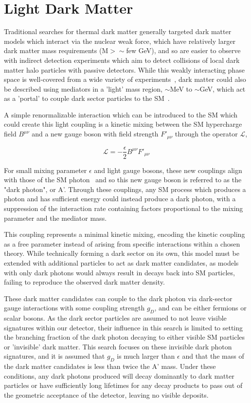 \section{Light Dark Matter}
Traditional searches for thermal dark matter generally targeted dark matter models which interact via the nuclear weak force, which have relatively larger dark matter mass requirements (M$>\sim$few GeV), and so are easier to observe with indirect detection experiments which aim to detect collisions of local dark matter halo particles with passive detectors.
While this weakly interacting phase space is well-covered from a wide variety of experiments~\cite{Roszkowski_2018}, dark matter could also be described using mediators in a 'light' mass region, $\sim$MeV to $\sim$GeV, which act as a 'portal' to couple dark sector particles to the SM~\cite{darkSectors}.

A simple renormalizable interaction which can be introduced to the SM which could create this light coupling is a kinetic mixing between the SM hypercharge field $B^{\mu\nu}$ and a new gauge boson with field strength $F'_{\mu\nu}$ through the operator $\mathcal{L}$,  

\begin{equation}
	\label{eq:LDMlagrangian}
	\mathcal{L} = - \frac{\epsilon}{2} B^{\mu\nu}F'_{\mu\nu}
\end{equation}

For small mixing parameter $\epsilon$ and light gauge bosons, these new couplings align with those of the SM photon~\cite{Bauer_2018} and so this new gauge boson is referred to as the "dark photon", or A'.
Through these couplings, any SM process which produces a photon and has sufficient energy could instead produce a dark photon, with a suppression of the interaction rate containing factors proportional to the mixing parameter and the mediator mass.

This coupling represents a minimal kinetic mixing, encoding the kinetic coupling as a free parameter instead of arising from specific interactions within a chosen theory. 
While technically forming a dark sector on its own, this model must be extended with additional particles to act as dark matter candidates, as models with only dark photons would always result in decays back into SM particles, failing to reproduce the observed dark matter density.

These dark matter candidates can couple to the dark photon via dark-sector gauge interactions with some coupling strength $g_D$, and can be either fermions or scalar bosons.
As the dark sector particles are assumed to not leave visible signatures within our detector, their influence in this search is limited to setting the branching fraction of the dark photon decaying to either visible SM particles or 'invisible' dark matter.
This search focuses on these invisible dark photon signatures, and it is assumed that $g_D$ is much larger than $\epsilon$ and that the mass of the dark matter candidates is less than twice the A' mass.
Under these conditions, any dark photons produced will decay dominantly to dark matter particles or have sufficiently long lifetimes for any decay products to pass out of the geometric acceptance of the detector, leaving no visible deposits.


